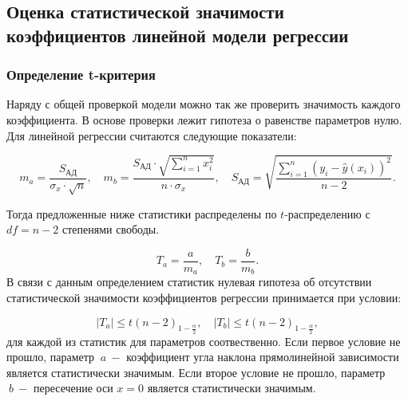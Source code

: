 \documentclass[
]{article}
\begin{document}
\hypertarget{ux43eux446ux435ux43dux43aux430-ux441ux442ux430ux442ux438ux441ux442ux438ux447ux435ux441ux43aux43eux439-ux437ux43dux430ux447ux438ux43cux43eux441ux442ux438-ux43aux43eux44dux444ux444ux438ux446ux438ux435ux43dux442ux43eux432-ux43bux438ux43dux435ux439ux43dux43eux439-ux43cux43eux434ux435ux43bux438-ux440ux435ux433ux440ux435ux441ux441ux438ux438}{%
\subsection{\texorpdfstring{\textbf{Оценка статистической значимости
коэффициентов линейной модели
регрессии}}{Оценка статистической значимости коэффициентов линейной модели регрессии}}\label{ux43eux446ux435ux43dux43aux430-ux441ux442ux430ux442ux438ux441ux442ux438ux447ux435ux441ux43aux43eux439-ux437ux43dux430ux447ux438ux43cux43eux441ux442ux438-ux43aux43eux44dux444ux444ux438ux446ux438ux435ux43dux442ux43eux432-ux43bux438ux43dux435ux439ux43dux43eux439-ux43cux43eux434ux435ux43bux438-ux440ux435ux433ux440ux435ux441ux441ux438ux438}}

\hypertarget{ux43eux43fux440ux435ux434ux435ux43bux435ux43dux438ux435-t-ux43aux440ux438ux442ux435ux440ux438ux44f}{%
\subsubsection{\texorpdfstring{\textbf{Определение
t-критерия}}{Определение t-критерия}}\label{ux43eux43fux440ux435ux434ux435ux43bux435ux43dux438ux435-t-ux43aux440ux438ux442ux435ux440ux438ux44f}}

Наряду с общей проверкой модели можно так же проверить значимость
каждого коэффициента. В основе проверки лежит гипотеза о равенстве
параметров нулю. Для линейной регрессии считаются следующие показатели:

\[
m_a = \frac{S_{\text{АД}}}{\sigma_x \cdot \sqrt{n}}, \quad m_b = \frac{S_{\text{АД}} \cdot \sqrt{\sum\limits_{i=1}^{n}x_i^2}}{n \cdot \sigma_x}, \quad S_{\text{АД}} = \sqrt{\frac{\sum\limits_{i=1}^{n}\left( y_i - \hat{y}(x_i)  \right)^2}{n-2}}.
\]

Тогда предложенные ниже статистики распределены по \(t\)-распределению с
\(df = n-2\) степенями свободы.

\[
T_a = \frac{a}{m_a}, \quad T_b = \frac{b}{m_b}.
\] В связи с данным определением статистик нулевая гипотеза об
отсутствии статистической значимости коэффициентов регрессии принимается
при условии:

\[
\left| T_a \right| \le t(n-2)_{1-\frac{\alpha}{2}}, \quad \left| T_b \right| \le t(n-2)_{1-\frac{\alpha}{2}},
\] для каждой из статистик для параметров соотвественно. Если первое
условие не прошло, параметр \(\ a\ -\) коэффициент угла наклона
прямолинейной зависимости является статистически значимым. Если второе
условие не прошло, параметр \(\ b\ -\) пересечение оси \(x = 0\)
является статистически значимым.
\end{document}
